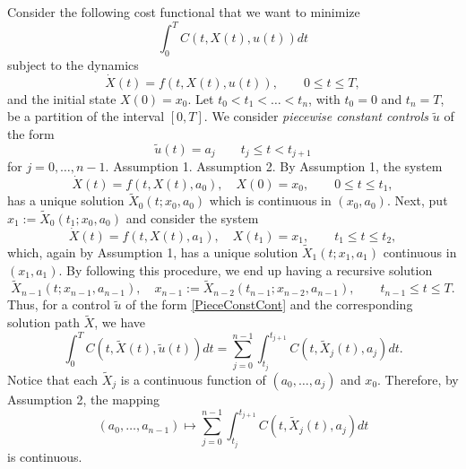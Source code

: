 Consider the following cost functional that we want to minimize
\begin{equation}\label{costFunctional}
  \int_0^T C(t,X(t),u(t)) dt
\end{equation}
subject to the dynamics
\begin{equation}\label{dynamics}
  \dot{X}(t) = f(t,X(t),u(t)),  \qquad    0\leq t \leq T,
\end{equation}
and the initial state $X(0)=x_0$. Let $t_0<t_1<\ldots <t_n$, with 
$t_0=0$ and $t_n=T$, be a partition of the interval $[0,T]$. 
We consider {\it piecewise constant controls} $\tilde{u}$ of the form
\begin{equation}\label{PieceConstCont}
  \tilde{u}(t) = a_j\qquad t_j\leq t < t_{j+1}
\end{equation}
 for $j=0,\ldots,n-1$.
{\sc Assumption 1}.
{\sc Assumption 2}.
By Assumption 1, the system
\[    
  \dot{X}(t) = f(t,X(t),a_0), \quad X(0)=x_0, \qquad    0\leq t \leq t_1,
\]
has a unique solution $\tilde{X}_0(t;x_0,a_0)$ which is continuous in 
$(x_0,a_0)$.  Next, put $x_1:=\tilde{X}_0(t_1;x_0,a_0)$ and consider the system
\[    
  \dot{X}(t) = f(t,X(t),a_1), \quad X(t_1)=x_1, \qquad    t_1\leq t \leq t_2,
\]
which, again by Assumption 1, has a unique solution $\tilde{X}_1(t;x_1,a_1)$ 
continuous in $(x_1,a_1)$. By following this procedure, we end up having a 
recursive solution
\[  
  \tilde{X}_{n-1}(t;x_{n-1},a_{n-1}),\quad   x_{n-1}:=\tilde{X}_{n-2}(t_{n-1};x_{n-2},a_{n-1}),     \qquad    t_{n-1}\leq t \leq T. 
\]
Thus, for a control $\tilde{u}$ of the form \eqref{PieceConstCont} and the 
corresponding solution path $\tilde{X}$, we have
\[
  \int_0^T 
    C(t,\tilde{X}(t), 
    \tilde{u}(t)) dt = 
      \sum_{j=0}^{n-1}
        \int_{t_j}^{t_{j+1}} 
        C(t,\tilde{X}_j(t),a_j) dt.
\]
Notice that each $\tilde{X}_j$ is a continuous function of $(a_0,\ldots,a_j)$	 
and $x_0$. Therefore, by Assumption 2, the mapping
\[
  (a_0,\ldots,a_{n-1}) 
  \mapsto  
  \sum_{j=0}^{n-1}   
  \int_{t_j}^{t_{j+1}} C(t,\tilde{X}_j(t),a_j) dt
\]
is continuous.
